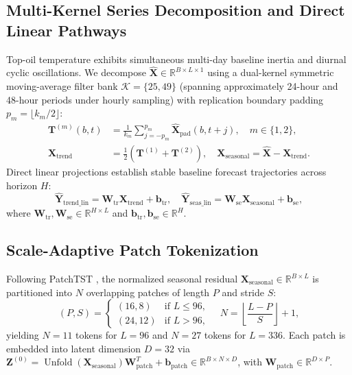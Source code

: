 \documentclass[pdflatex,sn-mathphys-num,referee,lineno]{sn-jnl}
\theoremstyle{thmstyleone}
\theoremstyle{thmstyletwo}
\theoremstyle{thmstylethree}
\begin{document}
\subsection{Multi-Kernel Series Decomposition and Direct Linear Pathways}\label{subsec:decomp}
Top-oil temperature exhibits simultaneous multi-day baseline inertia and diurnal cyclic oscillations. We decompose $\hat{\mathbf{X}} \in \mathbb{R}^{B \times L \times 1}$ using a dual-kernel symmetric moving-average filter bank $\mathcal{K} = \{25, 49\}$ (spanning approximately 24-hour and 48-hour periods under hourly sampling) with replication boundary padding $p_m = \lfloor k_m / 2 \rfloor$:
\begin{align}
\mathbf{T}^{(m)}(b, t) &= \frac{1}{k_m} \sum_{j = -p_m}^{p_m} \hat{\mathbf{X}}_{\mathrm{pad}}(b, t + j), \quad m \in \{1, 2\}, \label{eq:multi_kernel_pool} \\
\mathbf{X}_{\mathrm{trend}} &= \frac{1}{2} \left( \mathbf{T}^{(1)} + \mathbf{T}^{(2)} \right), \quad \mathbf{X}_{\mathrm{seasonal}} = \hat{\mathbf{X}} - \mathbf{X}_{\mathrm{trend}}. \label{eq:trend_seas_split}
\end{align}
Direct linear projections establish stable baseline forecast trajectories across horizon $H$:
\begin{equation}
\hat{\mathbf{Y}}_{\mathrm{trend\_lin}} = \mathbf{W}_{\mathrm{tr}} \mathbf{X}_{\mathrm{trend}} + \mathbf{b}_{\mathrm{tr}}, \quad \hat{\mathbf{Y}}_{\mathrm{seas\_lin}} = \mathbf{W}_{\mathrm{se}} \mathbf{X}_{\mathrm{seasonal}} + \mathbf{b}_{\mathrm{se}},
\label{eq:linear_heads}
\end{equation}
where $\mathbf{W}_{\mathrm{tr}}, \mathbf{W}_{\mathrm{se}} \in \mathbb{R}^{H \times L}$ and $\mathbf{b}_{\mathrm{tr}}, \mathbf{b}_{\mathrm{se}} \in \mathbb{R}^H$.

\subsection{Scale-Adaptive Patch Tokenization}\label{subsec:patching}
Following PatchTST \cite{nie2023patchtst}, the normalized seasonal residual $\mathbf{X}_{\mathrm{seasonal}} \in \mathbb{R}^{B \times L}$ is partitioned into $N$ overlapping patches of length $P$ and stride $S$:
\begin{equation}
(P, S) = \begin{cases} (16, 8) & \text{if } L \le 96, \\ (24, 12) & \text{if } L > 96, \end{cases} \quad N = \left\lfloor \frac{L - P}{S} \right\rfloor + 1,
\label{eq:patch_params}
\end{equation}
yielding $N = 11$ tokens for $L = 96$ and $N = 27$ tokens for $L = 336$. Each patch is embedded into latent dimension $D = 32$ via $\mathbf{Z}^{(0)} = \operatorname{Unfold}(\mathbf{X}_{\mathrm{seasonal}})\mathbf{W}_{\mathrm{patch}}^T + \mathbf{b}_{\mathrm{patch}} \in \mathbb{R}^{B \times N \times D}$, with $\mathbf{W}_{\mathrm{patch}} \in \mathbb{R}^{D \times P}$.
\end{document}
